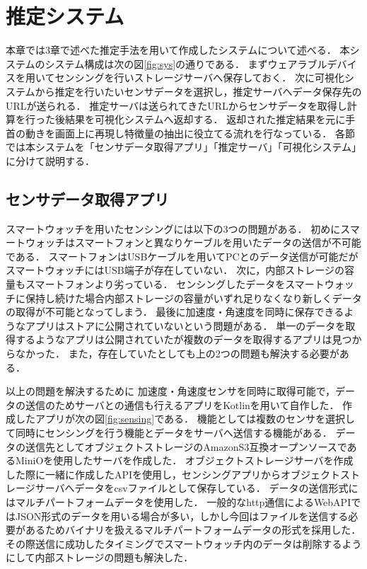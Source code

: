 \chapter{推定システム}
本章では3章で述べた推定手法を用いて作成したシステムについて述べる．
本システムのシステム構成は次の図\ref{fig:sys}の通りである．
まずウェアラブルデバイスを用いてセンシングを行いストレージサーバへ保存しておく．
次に可視化システムから推定を行いたいセンサデータを選択し，推定サーバへデータ保存先のURLが送られる．
推定サーバは送られてきたURLからセンサデータを取得し計算を行った後結果を可視化システムへ返却する．
返却された推定結果を元に手首の動きを画面上に再現し特徴量の抽出に役立てる流れを行なっている．
各節では本システムを「センサデータ取得アプリ」「推定サーバ」「可視化システム」に分けて説明する．
\section{センサデータ取得アプリ}
スマートウォッチを用いたセンシングには以下の3つの問題がある．
初めにスマートウォッチはスマートフォンと異なりケーブルを用いたデータの送信が不可能である．
スマートフォンはUSBケーブルを用いてPCとのデータ送信が可能だがスマートウォッチにはUSB端子が存在していない．
次に，内部ストレージの容量もスマートフォンより劣っている．
センシングしたデータをスマートウォッチに保持し続けた場合内部ストレージの容量がいずれ足りなくなり新しくデータの取得が不可能となってしまう．
最後に加速度・角速度を同時に保存できるようなアプリはストアに公開されていないという問題がある．
単一のデータを取得するようなアプリは公開されていたが複数のデータを取得するアプリは見つからなかった．
また，存在していたとしても上の2つの問題も解決する必要がある．

以上の問題を解決するために
加速度・角速度センサを同時に取得可能で，データの送信のためサーバとの通信も行えるアプリをKotlinを用いて自作した．
作成したアプリが次の図\ref{fig:sensing}である．
機能としては複数のセンサを選択して同時にセンシングを行う機能とデータをサーバへ送信する機能がある．
データの送信先としてオブジェクトストレージのAmazonS3互換オープンソースであるMiniOを使用したサーバを作成した．
オブジェクトストレージサーバを作成した際に一緒に作成したAPIを使用し，センシングアプリからオブジェクトストレージサーバへデータをcsvファイルとして保存している．
データの送信形式にはマルチパートフォームデータを使用した．
一般的なhttp通信によるWebAPIではJSON形式のデータを用いる場合が多い，しかし今回はファイルを送信する必要があるためバイナリを扱えるマルチパートフォームデータの形式を採用した．
その際送信に成功したタイミングでスマートウォッチ内のデータは削除するようにして内部ストレージの問題も解決した．




